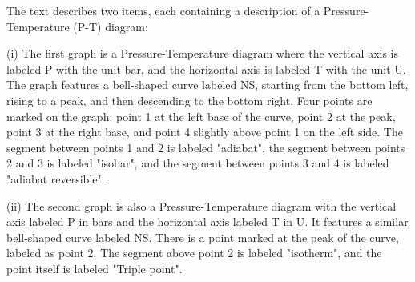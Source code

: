 The text describes two items, each containing a description of a Pressure-Temperature (P-T) diagram:

(i) The first graph is a Pressure-Temperature diagram where the vertical axis is labeled P with the unit bar, and the horizontal axis is labeled T with the unit U. The graph features a bell-shaped curve labeled NS, starting from the bottom left, rising to a peak, and then descending to the bottom right. Four points are marked on the graph: point 1 at the left base of the curve, point 2 at the peak, point 3 at the right base, and point 4 slightly above point 1 on the left side. The segment between points 1 and 2 is labeled "adiabat", the segment between points 2 and 3 is labeled "isobar", and the segment between points 3 and 4 is labeled "adiabat reversible".

(ii) The second graph is also a Pressure-Temperature diagram with the vertical axis labeled P in bars and the horizontal axis labeled T in U. It features a similar bell-shaped curve labeled NS. There is a point marked at the peak of the curve, labeled as point 2. The segment above point 2 is labeled "isotherm", and the point itself is labeled "Triple point".